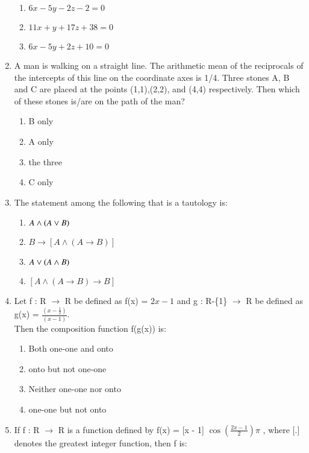 \documentclass[journal]{IEEEtran}
\numberwithin{equation}{enumi}
\numberwithin{figure}{enumi}
\begin{document}
\begin{enumerate}
\begin{enumerate}
        \item $6x - 5y - 2z - 2 = 0$
        \item $11x + y + 17z + 38 = 0$
        \item $6x - 5y + 2z + 10 = 0$
    \end{enumerate} 
    \item A man is walking on a straight line. The arithmetic mean of the reciprocals of the intercepts of this line on the coordinate axes is 1/4. Three stones A, B and C are placed at the points (1,1),(2,2), and (4,4) respectively. Then which of these stones is/are on the path of the man? \\
     \begin{multicols}{4}
    \begin{enumerate}
        \item B only 
        \item A only
        \item the three
        \item C only
    \end{enumerate} 
    \end{multicols}
    \item The statement among the following that is a tautology is: \\
    \begin{enumerate}
        \item $A \land \left(A \lor B\right)$
        \item $B \rightarrow [A \land (A \rightarrow B)]$
        \item $A \lor \left(A \land B\right)$
        \item $[A \land (A \rightarrow B) \rightarrow B]$
    \end{enumerate}
    \item Let f : R $\rightarrow$ R be defined as f(x) = $2x-1$ and g : R-\{1\} $\rightarrow$ R be defined as \\ g(x) = $\frac{(x-\frac{1}{2})}{(x-1)}$.\\Then the composition function f(g(x)) is: \\
    \begin{enumerate}
        \item Both one-one and onto
        \item onto but not one-one
        \item Neither one-one nor onto
        \item one-one but not onto
    \end{enumerate}
    \item If f : R $\rightarrow$ R is a function defined by f(x) = [x - 1] $\cos{(\frac{2x - 1}{2})\pi}$ , where [.] denotes the greatest integer function, then f is: \\

\end{enumerate}
\end{document}
